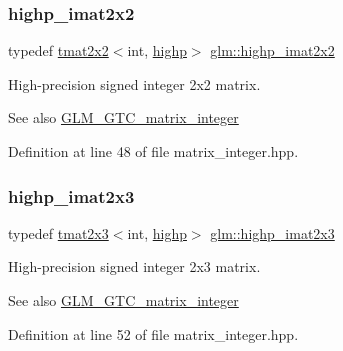 \subsubsection{\texorpdfstring{highp\_imat2x2}{highp\_imat2x2}}
{\footnotesize\ttfamily typedef \mbox{\hyperlink{structglm_1_1tmat2x2}{tmat2x2}}$<$int, \mbox{\hyperlink{namespaceglm_a0f04f086094c747d227af4425893f545ac6f7eab42eacbb10d59a58e95e362074}{highp}}$>$ \mbox{\hyperlink{group__gtc__matrix__integer_gab4411f2d106d24a32aaa3cb711dc8510}{glm\+::highp\+\_\+imat2x2}}}

High-\/precision signed integer 2x2 matrix. \begin{DoxySeeAlso}{See also}
\mbox{\hyperlink{group__gtc__matrix__integer}{G\+L\+M\+\_\+\+G\+T\+C\+\_\+matrix\+\_\+integer}} 
\end{DoxySeeAlso}


Definition at line 48 of file matrix\+\_\+integer.\+hpp.

\mbox{\label{group__gtc__matrix__integer_ga6c1a5f4d85de3f7eccb394970320bafc}} 
\subsubsection{\texorpdfstring{highp\_imat2x3}{highp\_imat2x3}}
{\footnotesize\ttfamily typedef \mbox{\hyperlink{structglm_1_1tmat2x3}{tmat2x3}}$<$int, \mbox{\hyperlink{namespaceglm_a0f04f086094c747d227af4425893f545ac6f7eab42eacbb10d59a58e95e362074}{highp}}$>$ \mbox{\hyperlink{group__gtc__matrix__integer_ga6c1a5f4d85de3f7eccb394970320bafc}{glm\+::highp\+\_\+imat2x3}}}

High-\/precision signed integer 2x3 matrix. \begin{DoxySeeAlso}{See also}
\mbox{\hyperlink{group__gtc__matrix__integer}{G\+L\+M\+\_\+\+G\+T\+C\+\_\+matrix\+\_\+integer}} 
\end{DoxySeeAlso}


Definition at line 52 of file matrix\+\_\+integer.\+hpp.

\mbox{\label{group__gtc__matrix__integer_gae7502957eb2ab9268726d87389ae2b55}} 
